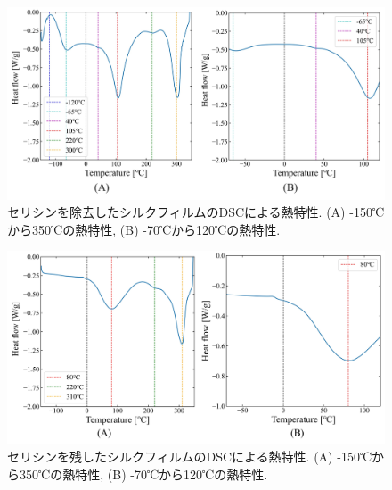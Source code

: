 \documentclass[dvipdfmx,12pt,a4paper]{jreport}
\begin{document}
	\begin{figure}[h]
		\centering
		\includegraphics[width=\linewidth]{熱プレスシルクフィルム_DSC.jpg}
		\caption{セリシンを除去したシルクフィルムのDSCによる熱特性. (A) -150℃から350℃の熱特性, 
		(B) -70℃から120℃の熱特性.}
		\label{セリシン除去フィルムにおけるDSC}
	\end{figure}
	\begin{figure}[H]
		\centering
		\includegraphics[width=\linewidth]{セリシンあり_熱プレスシルクフィルム_DSC.jpg}
		\caption{セリシンを残したシルクフィルムのDSCによる熱特性. (A) -150℃から350℃の熱特性, 
		(B) -70℃から120℃の熱特性.}
		\label{セリシンありフィルムにおけるDSC}
	\end{figure}
\end{document}
